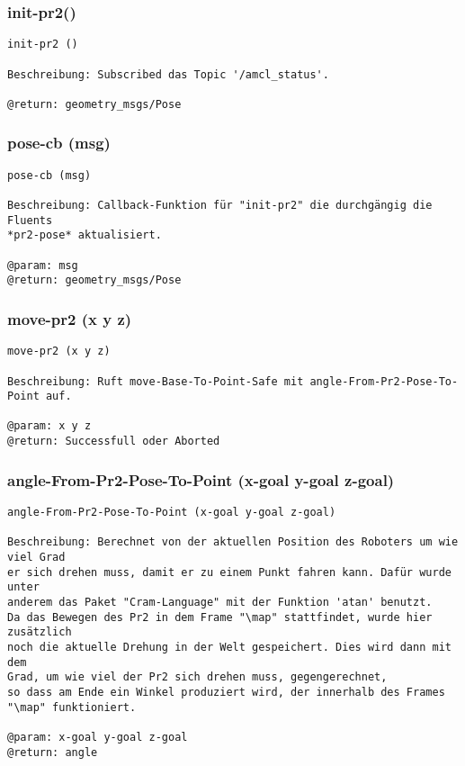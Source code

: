 \documentclass{suturo}
\begin{document}
\subsubsection{init-pr2()}
\begin{verbatim}
init-pr2 ()

Beschreibung: Subscribed das Topic '/amcl_status'.

@return: geometry_msgs/Pose
\end{verbatim}

\subsubsection{pose-cb (msg)}
\begin{verbatim}
pose-cb (msg)

Beschreibung: Callback-Funktion für "init-pr2" die durchgängig die Fluents
*pr2-pose* aktualisiert.

@param: msg
@return: geometry_msgs/Pose
\end{verbatim}

\subsubsection{move-pr2 (x y z)}
\begin{verbatim}
move-pr2 (x y z)

Beschreibung: Ruft move-Base-To-Point-Safe mit angle-From-Pr2-Pose-To-Point auf.

@param: x y z 
@return: Successfull oder Aborted
\end{verbatim}

\subsubsection{angle-From-Pr2-Pose-To-Point (x-goal y-goal z-goal)}
\begin{verbatim}
angle-From-Pr2-Pose-To-Point (x-goal y-goal z-goal)

Beschreibung: Berechnet von der aktuellen Position des Roboters um wie viel Grad
er sich drehen muss, damit er zu einem Punkt fahren kann. Dafür wurde unter 
anderem das Paket "Cram-Language" mit der Funktion 'atan' benutzt. 
Da das Bewegen des Pr2 in dem Frame "\map" stattfindet, wurde hier zusätzlich 
noch die aktuelle Drehung in der Welt gespeichert. Dies wird dann mit dem 
Grad, um wie viel der Pr2 sich drehen muss, gegengerechnet, 
so dass am Ende ein Winkel produziert wird, der innerhalb des Frames "\map" funktioniert.

@param: x-goal y-goal z-goal 
@return: angle 
\end{verbatim}
\end{document}
